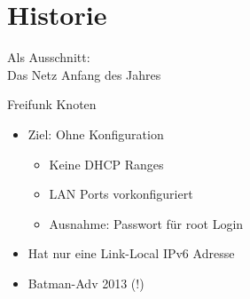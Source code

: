 \section{Historie}
\begin{frame}{}
    \begin{center}
        Als Ausschnitt:\\
        Das Netz Anfang des Jahres
     \end{center}
\end{frame}

\begin{frame}{Freifunk Knoten}
    \begin{itemize}
        \item Ziel: Ohne Konfiguration
        \begin{itemize}
            \item Keine DHCP Ranges
            \item LAN Ports vorkonfiguriert
            \item Ausnahme: Passwort für root Login
        \end{itemize}
        \item Hat nur eine Link-Local IPv6 Adresse
        \item Batman-Adv 2013 (!)
    \end{itemize}
\end{frame}

